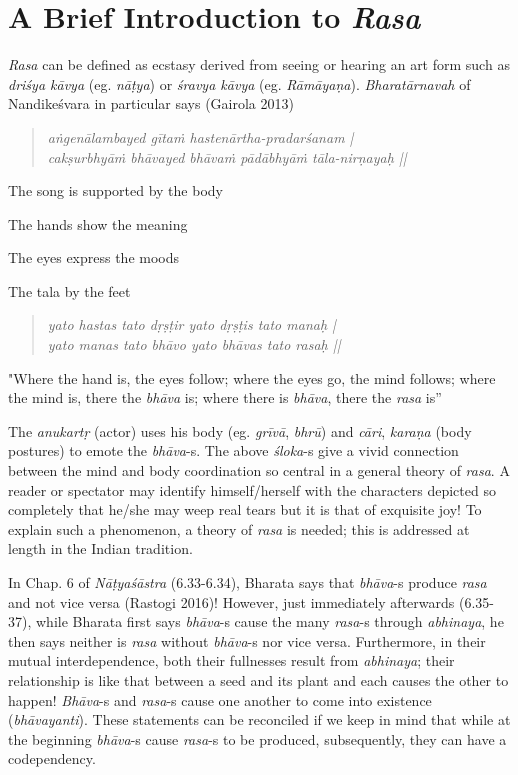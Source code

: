 \section{A Brief Introduction to \textsl{Rasa}}\label{chap7-sec2}

\textsl{Rasa} can be defined as ecstasy derived from seeing or hearing an art form such as \textsl{driśya kāvya} (eg. \textsl{nāṭya}) or \textsl{śravya kāvya} (eg. \textsl{Rāmāyaṇa}). \textsl{Bharatārnavah} of Nandikeśvara in particular says (Gairola 2013)

\begin{quote}
\textsl{aṅgenālambayed gītaṁ hastenārtha-pradarśanam |}\\
\textsl{cakṣurbhyāṁ bhāvayed bhāvaṁ pādābhyāṁ tāla-nirṇayaḥ ||}
\end{quote}

The song is supported by the body

The hands show the meaning

The eyes express the moods

The tala by the feet
\begin{quote}
\textsl{yato hastas tato dṛṣṭir yato dṛṣṭis tato manaḥ |}\\
\textsl{yato manas tato bhāvo yato bhāvas tato rasaḥ ||}
\end{quote}

"Where the hand is, the eyes follow; where the eyes go, the mind follows; where the mind is, there the \textsl{bhāva} is; where there is \textsl{bhāva}, there the \textsl{rasa} is”

The \textsl{anukartṛ} (actor) uses his body (eg. \textsl{grīvā}, \textsl{bhrū}) and \textsl{cāri}, \textsl{karaṇa} (body postures) to emote the \textsl{bhāva}-s. The above \textsl{śloka}-s give a vivid connection between the mind and body coordination so central in a general theory of \textsl{rasa}. A reader or spectator may identify himself/herself with the characters depicted so completely that he/she may weep real tears but it is that of exquisite joy! To explain such a phenomenon, a theory of \textsl{rasa} is needed; this is addressed at length in the Indian tradition. 

In Chap. 6 of \textsl{Nāṭyaśāstra} (6.33-6.34), Bharata says that \textsl{bhāva}-s produce \textsl{rasa} and not vice versa (Rastogi 2016)! However, just immediately afterwards (6.35-37), while Bharata first says \textsl{bhāva}-s cause the many \textsl{rasa}-s through \textsl{abhinaya}, he then says neither is \textsl{rasa} without \textsl{bhāva}-s nor vice versa. Furthermore, in their mutual interdependence, both their fullnesses result from \textsl{abhinaya}; their relationship is like that between a seed and its plant and each causes the other to happen! \textsl{Bhāva}-s and \textsl{rasa}-s cause one another to come into existence (\textsl{bhāvayanti}). These statements can be reconciled if we keep in mind that while at the beginning \textsl{bhāva}-s cause \textsl{rasa}-s to be produced, subsequently, they can have a codependency.


